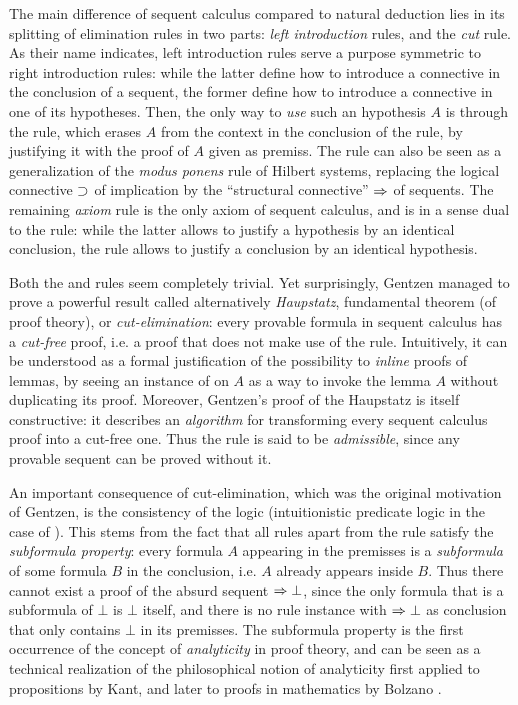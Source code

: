 The main difference of sequent calculus compared to natural deduction lies in
its splitting of elimination rules in two parts: \emph{left introduction} rules,
and the \emph{cut} rule. As their name indicates, left introduction rules serve
a purpose symmetric to right introduction rules: while the latter define how to
introduce a connective in the conclusion of a sequent, the former define how to
introduce a connective in one of its hypotheses. Then, the only way to
\emph{use} such an hypothesis $A$ is through the  rule, which erases
$A$ from the context in the conclusion of the rule, by justifying it with the
proof of $A$ given as premiss. The  rule can also be seen as a
generalization of the \textit{modus ponens} rule of Hilbert systems, replacing
the logical connective $\supset$ of implication by the ``structural connective''
$\Rightarrow$ of sequents. The remaining \emph{axiom} rule  is the only axiom
of sequent calculus, and is in a sense dual to the  rule: while the
latter allows to justify a hypothesis by an identical conclusion, the 
rule allows to justify a conclusion by an identical hypothesis.

Both the  and  rules seem completely trivial. Yet surprisingly,
Gentzen managed to prove a powerful result called alternatively
\textit{Haupstatz}, fundamental theorem (of proof theory), or
\emph{cut-elimination}: every provable formula in sequent calculus has a
\emph{cut-free} proof, i.e. a proof that does not make use of the 
rule. Intuitively, it can be understood as a formal justification of the
possibility to \emph{inline} proofs of lemmas, by seeing an instance of
 on $A$ as a way to invoke the lemma $A$ without duplicating its proof.
Moreover, Gentzen's proof of the Haupstatz is itself constructive: it describes
an \emph{algorithm} for transforming every sequent calculus proof into a
cut-free one. Thus the  rule is said to be \emph{admissible}, since any
provable sequent can be proved without it.

An important consequence of cut-elimination, which was the original motivation
of Gentzen, is the consistency of the logic (intuitionistic predicate logic in
the case of ). This stems from the fact that all rules apart from the
 rule satisfy the \emph{subformula property}: every formula $A$
appearing in the premisses is a \emph{subformula} of some formula $B$ in the
conclusion, i.e. $A$ already appears inside $B$. Thus there cannot exist a proof
of the absurd sequent $\Rightarrow \bot$, since the only formula that is a subformula
of $\bot$ is $\bot$ itself, and there is no rule instance with $\Rightarrow \bot$ as
conclusion that only contains $\bot$ in its premisses. The subformula property
is the first occurrence of the concept of \emph{analyticity} in proof theory,
and can be seen as a technical realization of the philosophical notion of
analyticity first applied to propositions by Kant, and later to proofs in
mathematics by Bolzano .

